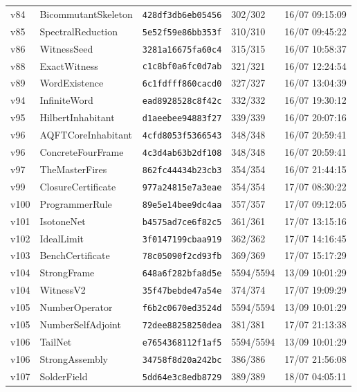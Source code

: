 \documentclass[11pt]{article}
\theoremstyle{definition}\newtheorem{deriv}{Derivação}
\begin{document}
{\begin{longtable}{@{}lllll@{}}
v84 & BicommutantSkeleton & \texttt{428df3db6eb05456} & 302/302 & 16/07 09:15:09 \\
v85 & SpectralReduction & \texttt{5e52f59e86bb353f} & 310/310 & 16/07 09:45:22 \\
v86 & WitnessSeed & \texttt{3281a16675fa60c4} & 315/315 & 16/07 10:58:37 \\
v88 & ExactWitness & \texttt{c1c8bf0a6fc0d7ab} & 321/321 & 16/07 12:24:54 \\
v89 & WordExistence & \texttt{6c1fdfff860cacd0} & 327/327 & 16/07 13:04:39 \\
v94 & InfiniteWord & \texttt{ead8928528c8f42c} & 332/332 & 16/07 19:30:12 \\
v95 & HilbertInhabitant & \texttt{d1aeebee94883f27} & 339/339 & 16/07 20:07:16 \\
v96 & AQFTCoreInhabitant & \texttt{4cfd8053f5366543} & 348/348 & 16/07 20:59:41 \\
v96 & ConcreteFourFrame & \texttt{4c3d4ab63b2df108} & 348/348 & 16/07 20:59:41 \\
v97 & TheMasterFires & \texttt{862fc44434b23cb3} & 354/354 & 16/07 21:44:15 \\
v99 & ClosureCertificate & \texttt{977a24815e7a3eae} & 354/354 & 17/07 08:30:22 \\
v100 & ProgrammerRule & \texttt{89e5e14bee9dc4aa} & 357/357 & 17/07 09:12:05 \\
v101 & IsotoneNet & \texttt{b4575ad7ce6f82c5} & 361/361 & 17/07 13:15:16 \\
v102 & IdealLimit & \texttt{3f0147199cbaa919} & 362/362 & 17/07 14:16:45 \\
v103 & BenchCertificate & \texttt{78c05090f2cd93fb} & 369/369 & 17/07 15:17:29 \\
v104 & StrongFrame & \texttt{648a6f282bfa8d5e} & 5594/5594 & 13/09 10:01:29 \\
v104 & WitnessV2 & \texttt{35f47bebde47a54e} & 374/374 & 17/07 19:09:29 \\
v105 & NumberOperator & \texttt{f6b2c0670ed3524d} & 5594/5594 & 13/09 10:01:29 \\
v105 & NumberSelfAdjoint & \texttt{72dee88258250dea} & 381/381 & 17/07 21:13:38 \\
v106 & TailNet & \texttt{e7654368112f1af5} & 5594/5594 & 13/09 10:01:29 \\
v106 & StrongAssembly & \texttt{34758f8d20a242bc} & 386/386 & 17/07 21:56:08 \\
v107 & SolderField & \texttt{5dd64e3c8edb8729} & 389/389 & 18/07 04:05:11 \\

\end{longtable}}
\end{document}
